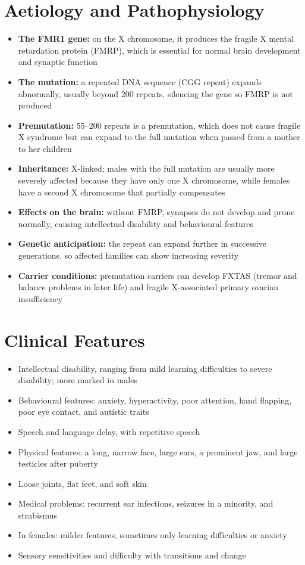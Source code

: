 \section*{Aetiology and Pathophysiology}
\begin{itemize}
    \item \textbf{The FMR1 gene:} on the X chromosome, it produces the fragile X mental retardation protein (FMRP), which is essential for normal brain development and synaptic function
    \item \textbf{The mutation:} a repeated DNA sequence (CGG repeat) expands abnormally, usually beyond 200 repeats, silencing the gene so FMRP is not produced
    \item \textbf{Premutation:} 55--200 repeats is a premutation, which does not cause fragile X syndrome but can expand to the full mutation when passed from a mother to her children
    \item \textbf{Inheritance:} X-linked; males with the full mutation are usually more severely affected because they have only one X chromosome, while females have a second X chromosome that partially compensates
    \item \textbf{Effects on the brain:} without FMRP, synapses do not develop and prune normally, causing intellectual disability and behavioural features
    \item \textbf{Genetic anticipation:} the repeat can expand further in successive generations, so affected families can show increasing severity
    \item \textbf{Carrier conditions:} premutation carriers can develop FXTAS (tremor and balance problems in later life) and fragile X-associated primary ovarian insufficiency
\end{itemize}

\section*{Clinical Features}
\begin{itemize}
    \item Intellectual disability, ranging from mild learning difficulties to severe disability; more marked in males
    \item Behavioural features: anxiety, hyperactivity, poor attention, hand flapping, poor eye contact, and autistic traits
    \item Speech and language delay, with repetitive speech
    \item Physical features: a long, narrow face, large ears, a prominent jaw, and large testicles after puberty
    \item Loose joints, flat feet, and soft skin
    \item Medical problems: recurrent ear infections, seizures in a minority, and strabismus
    \item In females: milder features, sometimes only learning difficulties or anxiety
    \item Sensory sensitivities and difficulty with transitions and change
\end{itemize}

